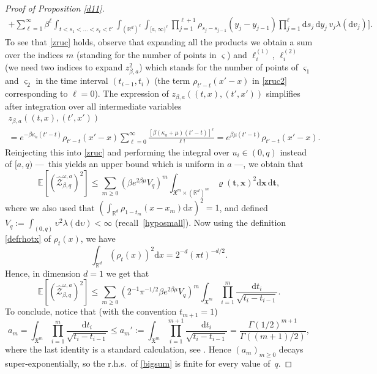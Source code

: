 \documentclass[10pt]{amsart}
\let\mathcal\mathscr
\theoremstyle{definition}
\newcommand{\bt}{\boldsymbol{t}}
\newcommand{\bx}{\boldsymbol{x}}
\newcommand{\dd}{\mathrm{d}}
\newcommand{\cZ}{{\ensuremath{\mathcal Z}} }
\newcommand{\bbE}{{\ensuremath{\mathbb E}} }
\newcommand{\bbR}{{\ensuremath{\mathbb R}} }
\let\gb\beta
\let\gG\Gamma
\let\ups\upsilon
\let\go\omega
\begin{document}
\begin{proof}[Proof of Proposition \ref{d11}]
\begin{multline}
+ \sum_{\ell=1}^{\infty} \beta^{\ell} \int_{ t< s_1<\dots<s_{\ell}<t' } \int_{(\bbR^d)^{\ell}} \int_{[a,\infty)^\ell} \prod_{j=1}^{\ell+1} \rho_{s_j-s_{j-1}} (y_j-y_{j-1}) \prod_{j=1}^{\ell}
\dd s_j\, \dd y_j\, v_j \lambda(\dd v_j) \bigg].
\end{multline}
To see that \eqref{zruc} holds, observe that expanding all the products we obtain a sum over the indices $m$ (standing for the number of points in $\varsigma$) and $\ell^{(1)}_i$, $\ell^{(2)}_i$ (we need two indices to expand $z^2_{\beta,a}$) which stands for
the number of points of $\varsigma_1$ and $\varsigma_2$ in the time interval $(t_{i-1},t_{i})$
(the term $\rho_{t'-t}(x'-x)$ in \eqref{zruc2} corresponding to $\ell=0$).
The expression of $z_{\beta,a} ((t,x), (t',x'))$ simplifies after integration over all intermediate variables\vspace*{-5pt}
\begin{multline}
z_{\beta,a} ((t,x), (t',x')) \\[-5pt]
= e^{ -\gb \kappa_a (t'-t)} \rho_{t'-t}(x'-x) \sum_{\ell=0}^{\infty} \frac{[\gb (\kappa_a +\mu) (t'-t)]^{\ell}}{ \ell !}= e^{ \gb \mu (t'-t)}
\rho_{t'-t}(x'-x).
\end{multline}
Reinjecting this into \eqref{zruc} and performing the integral over $u_i\in (0,q)$ instead of $[a,q)$ ---~this yields an upper bound which is uniform in $a$ ---, we obtain that
\begin{equation}
\label{eq:secondmomentZq}
\bbE \left[ (\hat \cZ^{\go,a}_{\beta,q})^2 \right]
\le \sum_{m \ge 0} \left(\gb e^{2\gb \mu} V_q \right)^{m} \int_{ \mathfrak{X}^m \times (\bbR^d)^m}
\varrho(\bt,\bx)^2
\dd \bx\, \dd \bt,
\end{equation}
where we also used that $(\int_{\bbR^d} \!\rho_{1-t_m}(x-x_m) \dd x)^2\!=\!1$, and defined \hbox{$V_q \!:=\! \int_{(0,q)}\! \ups^2 \lambda(\dd \ups)\!<\!\infty$} (recall~\eqref{hyposmall}).
Now using the definition \eqref{defrhotx} of $\rho_t(x)$, we have
\begin{equation}\label{lekalek}
\int_{\bbR^d}(\rho_{t}(x))^2\dd x
= 2^{-d}(\pi t)^{-d/2}.
\end{equation}
Hence, in dimension $d=1$ we get that
\begin{equation}\label{bigsum}
\bbE \left[ (\hat \cZ^{\go,a}_{\beta,q})^2 \right]\le \sum_{m \ge 0} \left(2^{-1}\pi^{-1/2} \beta e^{2\gb \mu} V_q \right)^{m} \int_{\mathfrak{X}^m} \prod_{i=1}^m
\frac{ \dd t_i}{\sqrt {t_i-t_{i-1}}}.
\end{equation}
To conclude, notice that (with the convention $t_{m+1}=1$)
\[
a_m= \int_{\mathfrak{X}^m} \prod_{i=1}^m
\frac{ \dd t_i}{\sqrt {t_i-t_{i-1}}}
\leq a_m' := \int_{\mathfrak{X}^m}
\prod_{i=1}^{m+1}
\frac{ \dd t_i}{\sqrt {t_i-t_{i-1}}}
= \frac{\gG(1/2)^{m+1} }{\gG((m+1)/2)},
\]
where the last identity is a standard calculation, see \eg \cite[Lem.\,A.3]{BL20_disc}.
Hence $(a_m)_{m\geq 0}$ decays super-exponentially,
so the r.h.s.\ of \eqref{bigsum} is finite for every value of~$q$.
\end{proof}
\end{document}
